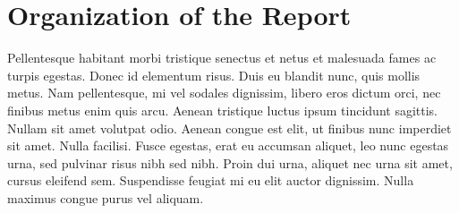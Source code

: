 \section{Organization of the Report}
Pellentesque habitant morbi tristique senectus et netus et malesuada fames ac turpis egestas. Donec id elementum risus. Duis eu blandit nunc, quis mollis metus. Nam pellentesque, mi vel sodales dignissim, libero eros dictum orci, nec finibus metus enim quis arcu. Aenean tristique luctus ipsum tincidunt sagittis. Nullam sit amet volutpat odio. Aenean congue est elit, ut finibus nunc imperdiet sit amet. Nulla facilisi. Fusce egestas, erat eu accumsan aliquet, leo nunc egestas urna, sed pulvinar risus nibh sed nibh. Proin dui urna, aliquet nec urna sit amet, cursus eleifend sem. Suspendisse feugiat mi eu elit auctor dignissim. Nulla maximus congue purus vel aliquam.
